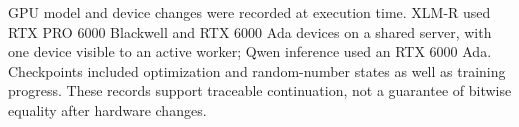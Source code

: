 GPU model and device changes were recorded at execution time. XLM-R used RTX PRO 6000 Blackwell and RTX 6000 Ada devices on a shared server, with one device visible to an active worker; Qwen inference used an RTX 6000 Ada. Checkpoints included optimization and random-number states as well as training progress. These records support traceable continuation, not a guarantee of bitwise equality after hardware changes.
